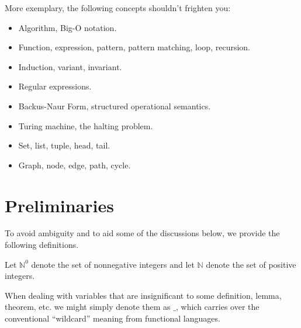 More exemplary, the following concepts shouldn't frighten you:

\begin{itemize}

\item Algorithm, Big-O notation.

\item Function, expression, pattern, pattern matching, loop, recursion.

\item Induction, variant, invariant.

\item Regular expressions.

\item Backus-Naur Form, structured operational semantics.

\item Turing machine, the halting problem.

\item Set, list, tuple, head, tail.

\item Graph, node, edge, path, cycle.

\end{itemize}

\section{Preliminaries}

To avoid ambiguity and to aid some of the discussions below, we provide the
following definitions.

\begin{definition} Let $\mathbb{N}^0$ denote the set of nonnegative integers
and let $\mathbb{N}$ denote the set of positive integers.\end{definition}

\begin{definition} When dealing with variables that are insignificant to some
definition, lemma, theorem, etc. we might simply denote them as $\_$, which
carries over the conventional ``wildcard'' meaning from functional
languages.\end{definition}

